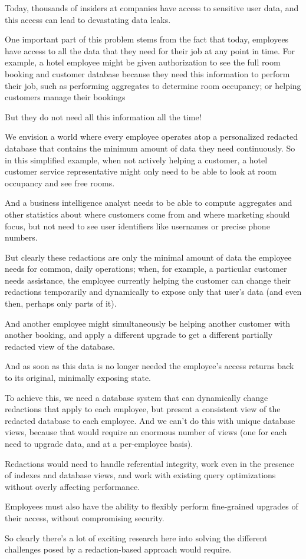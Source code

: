 Today, thousands of insiders at companies have access to sensitive user data,
and this access can lead to devastating data leaks.

One important part of this problem stems from the fact that today, employees
have access to all the data that they need for their job at any point in time.
For example, a hotel employee might be given authorization to see the full room
booking and customer database because they need this information to perform
their job, such as performing aggregates to determine room occupancy; or helping
customers manage their bookings

But they do not need all this information all the time!


We envision a world where every employee operates atop a personalized redacted
database that contains the minimum amount of data they need continuously. So in
this simplified example, when not actively helping a customer, a hotel customer
service representative might only need to be able to look at room occupancy and
see free rooms.

And a business intelligence analyst needs to be able to compute aggregates and
other statistics about where customers come from and where marketing should
focus, but not need to see user identifiers like usernames or precise phone
numbers.


But clearly these redactions are only the minimal amount of data the employee
needs for common, daily operations; when, for example, a particular customer
needs assistance, the employee currently helping the customer can change their
redactions temporarily and dynamically to expose only that user’s data (and even
then, perhaps only parts of it).

And another employee might simultaneously be helping another customer with
another booking, and apply a different upgrade to get a different partially
redacted view of the database.

And as soon as this data is no longer needed the employee’s access returns back
to its original, minimally exposing state.

To achieve this, we need a database system that can dynamically change
redactions that apply to each employee, but present a consistent view of the
redacted database to each employee.  And we can’t do this with unique database
views, because that would require an enormous number of views (one for each need
to upgrade data, and at a per-employee basis).

Redactions would need to handle referential integrity, work even in the presence
of indexes and database views, and work with existing query optimizations
without overly affecting performance.

Employees must also have the ability to flexibly perform fine-grained upgrades
of their access, without compromising security.

So clearly there’s a lot of exciting research here into solving the different
challenges posed by a redaction-based approach would require.


